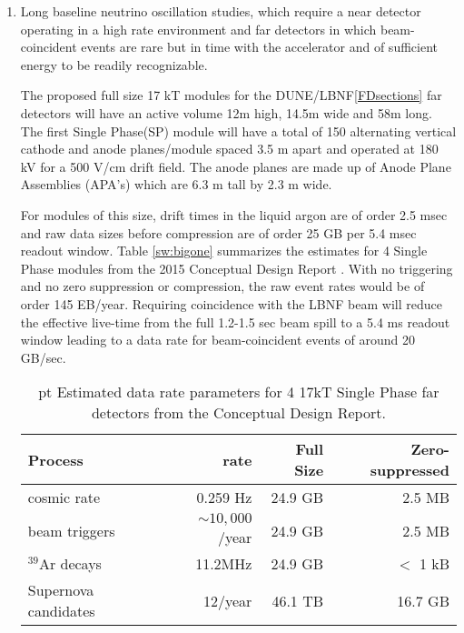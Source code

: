 \begin{enumerate}
\item Long baseline neutrino oscillation studies, which require a near detector operating in a high rate environment and far detectors in which beam-coincident events are rare but in time with the accelerator and of sufficient energy to be readily recognizable.  

The proposed  full size 17 kT modules for the DUNE/LBNF\ref{FDsections} far detectors will  have an active volume 12m high, 14.5m wide and 58m long.  The first Single Phase(SP) module will have 
a total of 150 alternating vertical cathode and anode planes/module  spaced 3.5 m apart and operated at 180 kV for a 500 V/cm drift field.  The anode planes are made up of Anode Plane Assemblies  (APA's) which are 6.3 m tall by 2.3 m wide. %

For modules of this size, drift times in the liquid argon are of order 2.5 msec and raw data sizes before compression are of order 25 GB per 5.4 msec readout window. Table \ref{sw:bigone} summarizes the estimates for 4 Single Phase modules from the 2015 Conceptual Design Report \cite{cdr-annex-rates}.  With no triggering and no zero suppression or compression, the raw event rates would be of order 145 EB/year. 
Requiring  coincidence with the LBNF beam will reduce the effective live-time from the full 1.2-1.5 sec beam spill to a 5.4 ms readout window leading to a data rate for beam-coincident events of around 20 GB/sec.

\begin{table}[htp]
\begin{center}
\begin{tabular}{|l|r|r|r|}
\hline
Process&rate&Full Size&Zero-suppressed\\
\hline
cosmic rate&0.259 Hz&24.9 GB&2.5 MB\\
beam triggers&$\sim 10,000$/year&24.9 GB&2.5 MB\\
$^{39}$Ar decays&11.2MHz&24.9 GB&$<$ 1 kB\\
Supernova candidates &12/year&46.1 TB&16.7 GB\\
\hline
\end{tabular}
\end{center}
\caption{\normalsize {} pt Estimated data rate parameters for 4 17kT Single Phase far detectors from the Conceptual Design Report. }
\label{bigone}
\end{table}%



\end{enumerate}
